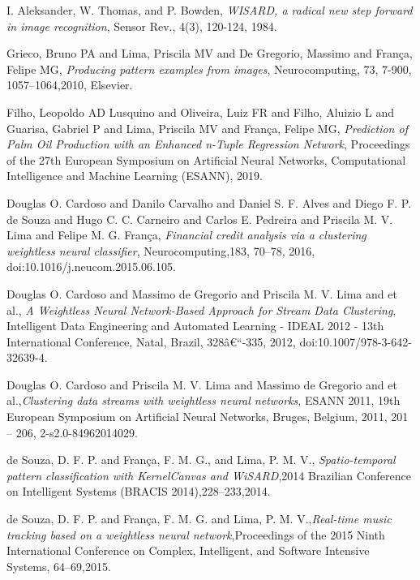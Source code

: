 \documentclass[12pt]{article}
\begin{document}
\begin{footnotesize}
\begin{thebibliography}{99}
I. Aleksander, W. Thomas, and P. Bowden, \emph{WISARD, a radical new step forward in image recognition}, Sensor Rev., 4(3), 120-124, 1984.

Grieco, Bruno PA and Lima, Priscila MV and De Gregorio, Massimo and Fran{\c{c}}a, Felipe MG, \emph{Producing pattern examples from images}, Neurocomputing, 73, 7-900, 1057--1064,2010, Elsevier.

Filho, Leopoldo AD Lusquino and Oliveira, Luiz FR and Filho, Aluizio L and Guarisa, Gabriel P and Lima, Priscila MV and Fran{\c{c}}a, Felipe MG, \emph{Prediction of Palm Oil Production with an Enhanced n-Tuple Regression Network}, Proceedings of the 27th European Symposium on Artificial Neural Networks, Computational Intelligence and Machine Learning (ESANN), 2019.

Douglas O. Cardoso and Danilo Carvalho and Daniel S. F. Alves and Diego F. P. de Souza and Hugo C. C. Carneiro and Carlos E. Pedreira and Priscila M. V. Lima and Felipe M. G. Fran\c{c}a, \emph{Financial credit analysis via a clustering weightless neural classifier}, Neurocomputing,183, 70--78, 2016,
doi:10.1016/j.neucom.2015.06.105.

Douglas O. Cardoso and Massimo de Gregorio and Priscila M. V. Lima and et al., \emph{A Weightless Neural Network-Based Approach for Stream Data Clustering}, Intelligent Data Engineering and Automated Learning - IDEAL 2012 - 13th International Conference, Natal, Brazil, 328â€“-335, 2012, doi:10.1007/978-3-642-32639-4.

Douglas O. Cardoso and Priscila M. V. Lima and Massimo de Gregorio and et al.,\emph{Clustering data streams with weightless neural networks}, ESANN 2011, 19th European Symposium on Artificial Neural Networks, Bruges, Belgium, 2011, 201 -- 206, 2-s2.0-84962014029.

de Souza, D. F. P. and Fran\c{c}a, F. M. G., and Lima, P. M. V., \emph{Spatio-temporal pattern classification with KernelCanvas and WiSARD},2014 Brazilian Conference on Intelligent Systems (BRACIS 2014),228--233,2014.

de Souza, D. F. P. and Fran\c{c}a, F. M. G. and Lima, P. M. V.,\emph{Real-time music tracking based on a weightless neural network},Proceedings of the 2015 Ninth International Conference on Complex, Intelligent, and Software Intensive Systems, 64--69,2015.


\end{thebibliography}
\end{footnotesize}
\end{document}
